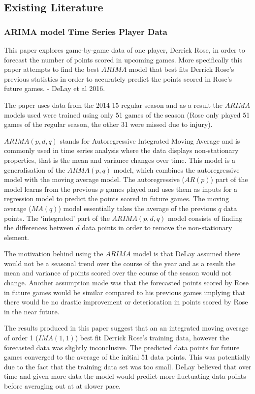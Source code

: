 \documentclass[a4paper,11pt,twoside]{article}
\begin{document}
\subsection{Existing Literature}
 
\subsubsection{ARIMA model Time Series Player Data}

This paper explores game-by-game data of one player, Derrick Rose, in order to forecast the number of points scored in upcoming games. More specifically this paper attempts to find the best $ARIMA$ model that best fits Derrick Rose's previous statistics in order to accurately predict the points scored in Rose's future games. - DeLay et al 2016.

The paper uses data from the 2014-15 regular season and as a result the $ARIMA$ models used  were trained using only 51 games of the season (Rose only played 51 games of the regular season, the other 31 were missed due to injury).

$ARIMA(p,d,q)$ stands for Autoregressive Integrated Moving Average and is commonly used in time series analysis where the data displays non-stationary properties, that is the mean and variance changes over time. This model is a generalisation of the $ARMA(p,q)$ model, which combines the autoregressive model with the moving average model. The autoregressive ($AR(p)$) part of the model learns from the previous $p$ games played and uses them as inputs for a regression model to predict the points scored in future games. The moving average ($MA(q)$) model essentially takes the average of the previous $q$ data points. The `integrated' part of the $ARIMA(p,d,q)$ model consists of finding the differences between $d$ data points in order to remove the non-stationary element.

The motivation behind using the $ARIMA$ model is that DeLay assumed there would not be a seasonal trend over the course of the year and as a result the mean and variance of points scored over the course of the season would not change. Another assumption made was that the forecasted points scored by Rose in future games would be similar compared to his previous games implying that there would be no drastic improvement or deterioration in points scored by Rose in the near future.

The results produced in this paper suggest that an an integrated moving average of order 1 ($IMA(1,1)$) best fit Derrick Rose's training data, however the forecasted data was slightly inconclusive. The predicted data points for future games converged to the average of the initial 51 data points. This was potentially due to the fact that the training data set was too small. DeLay believed that over time and given more data the model would predict more fluctuating data points before averaging out at at slower pace. 
\end{document}
